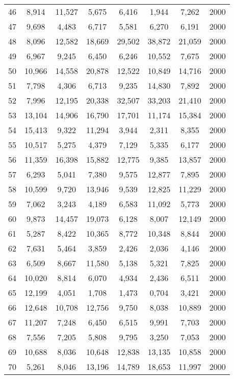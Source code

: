 \begin{longtable}{cccccccc}
46  & 8,914  & 11,527 & 5,675  & 6,416  & 1,944  & 7,262  & 2000 \\
47  & 9,698  & 4,483  & 6,717  & 5,581  & 6,270  & 6,191  & 2000 \\
48  & 8,096  & 12,582 & 18,669 & 29,502 & 38,872 & 21,059 & 2000 \\
49  & 6,967  & 9,245  & 6,450  & 6,246  & 10,552 & 7,675  & 2000 \\
50  & 10,966 & 14,558 & 20,878 & 12,522 & 10,849 & 14,716 & 2000 \\
51  & 7,798  & 4,306  & 6,713  & 9,235  & 14,830 & 7,892  & 2000 \\
52  & 7,996  & 12,195 & 20,338 & 32,507 & 33,203 & 21,410 & 2000 \\
53  & 13,104 & 14,906 & 16,790 & 17,701 & 11,174 & 15,384 & 2000 \\
54  & 15,413 & 9,322  & 11,294 & 3,944  & 2,311  & 8,355  & 2000 \\
55  & 10,517 & 5,275  & 4,379  & 7,129  & 5,335  & 6,177  & 2000 \\
56  & 11,359 & 16,398 & 15,882 & 12,775 & 9,385  & 13,857 & 2000 \\
57  & 6,293  & 5,041  & 7,380  & 9,575  & 12,877 & 7,895  & 2000 \\
58  & 10,599 & 9,720  & 13,946 & 9,539  & 12,825 & 11,229 & 2000 \\
59  & 7,062  & 3,243  & 4,189  & 6,583  & 11,092 & 5,773  & 2000 \\
60  & 9,873  & 14,457 & 19,073 & 6,128  & 8,007  & 12,149 & 2000 \\
61  & 5,287  & 8,422  & 10,365 & 8,772  & 10,348 & 8,844  & 2000 \\
62  & 7,631  & 5,464  & 3,859  & 2,426  & 2,036  & 4,146  & 2000 \\
63  & 6,509  & 8,667  & 11,580 & 5,138  & 5,321  & 7,825  & 2000 \\
64  & 10,020 & 8,814  & 6,070  & 4,934  & 2,436  & 6,511  & 2000 \\
65  & 12,199 & 4,051  & 1,708  & 1,473  & 0,704  & 3,421  & 2000 \\
66  & 12,648 & 10,708 & 12,756 & 9,750  & 8,038  & 10,889 & 2000 \\
67  & 11,207 & 7,248  & 6,450  & 6,515  & 9,991  & 7,703  & 2000 \\
68  & 7,556  & 7,205  & 5,808  & 9,795  & 3,250  & 7,053  & 2000 \\
69  & 10,688 & 8,036  & 10,648 & 12,838 & 13,135 & 10,858 & 2000 \\
70  & 5,261  & 8,046  & 13,196 & 14,789 & 18,653 & 11,997 & 2000 \\

\end{longtable}

